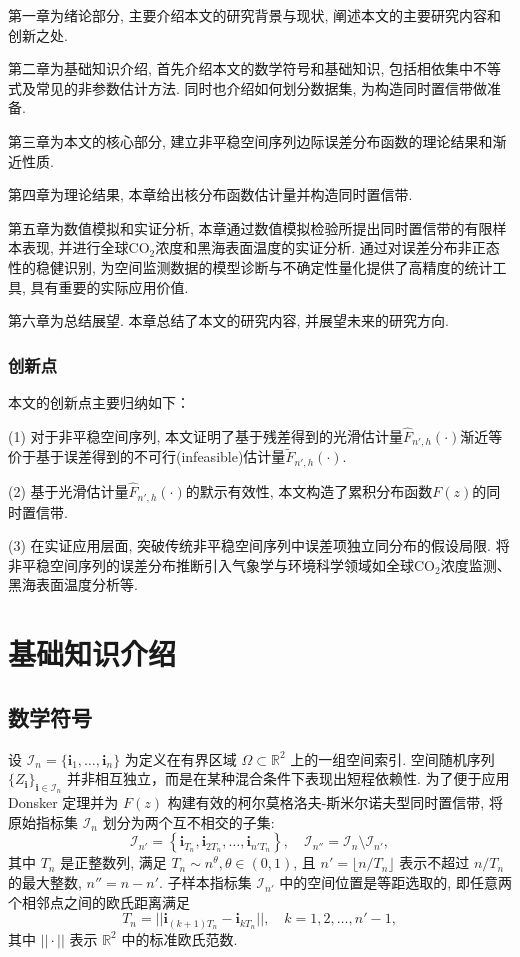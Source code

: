 \documentclass[a4paper,openay,14pt]{ctexbook}
\numberwithin{equation}{section}
\numberwithin{lem}{section}
\newcommand{\chapterwithfancyheader}[1]{  
    \chapter{#1} %
    \thispagestyle{fancy} %
}
\begin{document}
第一章为绪论部分,  主要介绍本文的研究背景与现状,  阐述本文的主要研究内容和创新之处. 

第二章为基础知识介绍,  首先介绍本文的数学符号和基础知识, 包括相依集中不等式及常见的非参数估计方法. 同时也介绍如何划分数据集, 为构造同时置信带做准备. 

第三章为本文的核心部分,   建立非平稳空间序列边际误差分布函数的理论结果和渐近性质.

第四章为理论结果, 本章给出核分布函数估计量并构造同时置信带. 

第五章为数值模拟和实证分析, 本章通过数值模拟检验所提出同时置信带的有限样本表现, 并进行全球CO$_2$浓度和黑海表面温度的实证分析. 通过对误差分布非正态性的稳健识别, 为空间监测数据的模型诊断与不确定性量化提供了高精度的统计工具, 具有重要的实际应用价值. 

第六章为总结展望. 本章总结了本文的研究内容,  并展望未来的研究方向. 

\subsection{创新点}
本文的创新点主要归纳如下：

(1) 对于非平稳空间序列, 本文证明了基于残差得到的光滑估计量$\hat{F}_{n',h}(\cdot)$渐近等价于基于误差得到的不可行(infeasible)估计量$\tilde{F}_{n',h}(\cdot)$.

(2) 基于光滑估计量$\hat{F}_{n',h}(\cdot)$的默示有效性, 本文构造了累积分布函数$F(z)$的同时置信带.

(3) 在实证应用层面, 突破传统非平稳空间序列中误差项独立同分布的假设局限. 将非平稳空间序列的误差分布推断引入气象学与环境科学领域如全球CO$_2$浓度监测、黑海表面温度分析等.

\chapterwithfancyheader{基础知识介绍}\label{SEC: Preliminary}

\section{数学符号}
设 \(\mathcal{I}_n = \{\mathbf{i}_1, \ldots, \mathbf{i}_n\}\) 为定义在有界区域 \(\Omega \subset \mathbb{R}^2\) 上的一组空间索引. 空间随机序列 $\{Z_{\mathbf{i}}\}_{\mathbf{i} \in \mathcal{I}_n}$ 并非相互独立，而是在某种混合条件下表现出短程依赖性. 为了便于应用 Donsker 定理并为 $F(z)$ 构建有效的柯尔莫格洛夫-斯米尔诺夫型同时置信带, 将原始指标集 $\mathcal{I}_n$ 划分为两个互不相交的子集:
\[
\mathcal{I}_{n'} = \left\{ \mathbf{i}_{T_n}, \mathbf{i}_{2T_n}, \ldots, \mathbf{i}_{n' T_n} \right\}, 
\quad 
\mathcal{I}_{n''} = \mathcal{I}_n \setminus \mathcal{I}_{n'},
\]
其中 $T_n$ 是正整数列, 满足 $T_n \sim n^{\theta}, \theta \in (0,1)$, 且 $n' = \lfloor n / T_n \rfloor$ 表示不超过 $n/T_n$ 的最大整数, $n'' = n - n'$. 子样本指标集 $\mathcal{I}_{n'}$ 中的空间位置是等距选取的, 即任意两个相邻点之间的欧氏距离满足
\[
T_n = ||\mathbf{i}_{(k+1)T_n} - \mathbf{i}_{kT_n}||, \quad k = 1,2,\dots,n'-1,
\]
其中 $||\cdot||$ 表示 $\mathbb{R}^2$ 中的标准欧氏范数.
\end{document}
